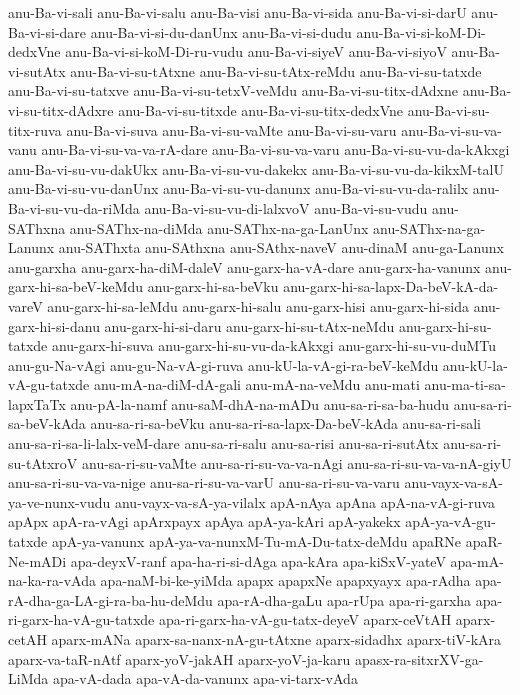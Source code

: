 {anu-Ba-vi-sali
anu-Ba-vi-salu
anu-Ba-visi
anu-Ba-vi-sida
anu-Ba-vi-si-darU
anu-Ba-vi-si-dare
anu-Ba-vi-si-du-danUnx
anu-Ba-vi-si-dudu
anu-Ba-vi-si-koM-Di-dedxVne
anu-Ba-vi-si-koM-Di-ru-vudu
anu-Ba-vi-siyeV
anu-Ba-vi-siyoV
anu-Ba-vi-sutAtx
anu-Ba-vi-su-tAtxne
anu-Ba-vi-su-tAtx-reMdu
anu-Ba-vi-su-tatxde
anu-Ba-vi-su-tatxve
anu-Ba-vi-su-tetxV-veMdu
anu-Ba-vi-su-titx-dAdxne
anu-Ba-vi-su-titx-dAdxre
anu-Ba-vi-su-titxde
anu-Ba-vi-su-titx-dedxVne
anu-Ba-vi-su-titx-ruva
anu-Ba-vi-suva
anu-Ba-vi-su-vaMte
anu-Ba-vi-su-varu
anu-Ba-vi-su-va-vanu
anu-Ba-vi-su-va-va-rA-dare
anu-Ba-vi-su-va-varu
anu-Ba-vi-su-vu-da-kAkxgi
anu-Ba-vi-su-vu-dakUkx
anu-Ba-vi-su-vu-dakekx
anu-Ba-vi-su-vu-da-kikxM-talU
anu-Ba-vi-su-vu-danUnx
anu-Ba-vi-su-vu-danunx
anu-Ba-vi-su-vu-da-ralilx
anu-Ba-vi-su-vu-da-riMda
anu-Ba-vi-su-vu-di-lalxvoV
anu-Ba-vi-su-vudu
anu-SAThxna
anu-SAThx-na-diMda
anu-SAThx-na-ga-LanUnx
anu-SAThx-na-ga-Lanunx
anu-SAThxta
anu-SAthxna
anu-SAthx-naveV
anu-dinaM
anu-ga-Lanunx
anu-garxha
anu-garx-ha-diM-daleV
anu-garx-ha-vA-dare
anu-garx-ha-vanunx
anu-garx-hi-sa-beV-keMdu
anu-garx-hi-sa-beVku
anu-garx-hi-sa-lapx-Da-beV-kA-da-vareV
anu-garx-hi-sa-leMdu
anu-garx-hi-salu
anu-garx-hisi
anu-garx-hi-sida
anu-garx-hi-si-danu
anu-garx-hi-si-daru
anu-garx-hi-su-tAtx-neMdu
anu-garx-hi-su-tatxde
anu-garx-hi-suva
anu-garx-hi-su-vu-da-kAkxgi
anu-garx-hi-su-vu-duMTu
anu-gu-Na-vAgi
anu-gu-Na-vA-gi-ruva
anu-kU-la-vA-gi-ra-beV-keMdu
anu-kU-la-vA-gu-tatxde
anu-mA-na-diM-dA-gali
anu-mA-na-veMdu
anu-mati
anu-ma-ti-sa-lapxTaTx
anu-pA-la-namf
anu-saM-dhA-na-mADu
anu-sa-ri-sa-ba-hudu
anu-sa-ri-sa-beV-kAda
anu-sa-ri-sa-beVku
anu-sa-ri-sa-lapx-Da-beV-kAda
anu-sa-ri-sali
anu-sa-ri-sa-li-lalx-veM-dare
anu-sa-ri-salu
anu-sa-risi
anu-sa-ri-sutAtx
anu-sa-ri-su-tAtxroV
anu-sa-ri-su-vaMte
anu-sa-ri-su-va-va-nAgi
anu-sa-ri-su-va-va-nA-giyU
anu-sa-ri-su-va-va-nige
anu-sa-ri-su-va-varU
anu-sa-ri-su-va-varu
anu-vayx-va-sA-ya-ve-nunx-vudu
anu-vayx-va-sA-ya-vilalx
apA-nAya
apAna
apA-na-vA-gi-ruva
apApx
apA-ra-vAgi
apArxpayx
apAya
apA-ya-kAri
apA-yakekx
apA-ya-vA-gu-tatxde
apA-ya-vanunx
apA-ya-va-nunxM-Tu-mA-Du-tatx-deMdu
apaRNe
apaR-Ne-mADi
apa-deyxV-ranf
apa-ha-ri-si-dAga
apa-kAra
apa-kiSxV-yateV
apa-mA-na-ka-ra-vAda
apa-naM-bi-ke-yiMda
apapx
apapxNe
apapxyayx
apa-rAdha
apa-rA-dha-ga-LA-gi-ra-ba-hu-deMdu
apa-rA-dha-gaLu
apa-rUpa
apa-ri-garxha
apa-ri-garx-ha-vA-gu-tatxde
apa-ri-garx-ha-vA-gu-tatx-deyeV
aparx-ceVtAH
aparx-cetAH
aparx-mANa
aparx-sa-nanx-nA-gu-tAtxne
aparx-sidadhx
aparx-tiV-kAra
aparx-va-taR-nAtf
aparx-yoV-jakAH
aparx-yoV-ja-karu
apasx-ra-sitxrXV-ga-LiMda
apa-vA-dada
apa-vA-da-vanunx
apa-vi-tarx-vAda
}

